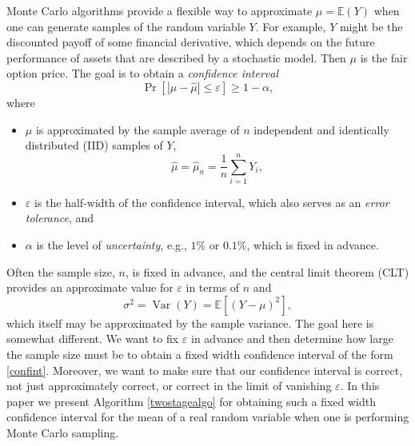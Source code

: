 \documentclass[graybox]{svmult}
\newcommand\e{\mathbb{E}}
\newcommand{\Prob}{\Pr}
\newcommand{\abs}[1]{\left|#1\right|}
\DeclareMathOperator{\var}{Var}
\newcommand{\hmu}{\hat{\mu}}
\def\abs#1{\ensuremath{\left \lvert #1 \right \rvert}}
\begin{document}
Monte Carlo algorithms provide a flexible way to approximate $\mu = \e(Y)$ when one can generate samples of the random variable $Y$. For example, $Y$ might be the discounted payoff of some financial derivative, which depends on the future performance of assets that are described by a stochastic model.  Then $\mu$ is the fair option price.  The goal is to obtain a \emph{confidence interval} 
\begin{equation} \label{confint}
\Prob[\abs{\mu - \hmu} \le \varepsilon] \ge 1-\alpha,
\end{equation}
where 
\begin{itemize}

\item $\mu$ is approximated by the sample average of $n$ independent and identically distributed (IID) samples of $Y$,
\begin{equation} \label{eq:samplemean}
\hmu = \hmu_n=\frac 1n \sum_{i=1}^n Y_i,
\end{equation}

\item $\varepsilon$ is the half-width of the confidence interval, which also serves as an \emph{error tolerance}, and

\item $\alpha$ is the level of \emph{uncertainty}, e.g., $1\%$ or $0.1\%$, which is fixed in advance.

\end{itemize}

Often the sample size, $n$, is fixed in advance, and the central limit theorem (CLT) provides an approximate value for $\varepsilon$ in terms of $n$ and 
\begin{equation} \label{sigmadef}
\sigma^2=\var(Y)=\e[(Y-\mu)^2],
\end{equation}
which itself may be approximated by the sample variance.
The goal here is somewhat different.  We want to fix $\varepsilon$ in advance and then determine how large the sample size must be to obtain a fixed
width confidence interval of the form \eqref{confint}. Moreover, we want to make sure that our confidence interval is correct, not just approximately correct, or correct in the limit of vanishing $\varepsilon$.  In this paper we present Algorithm \ref{twostagealgo} for obtaining such a fixed width confidence interval for the mean of a real random
variable when one is performing Monte Carlo sampling.
\end{document}
